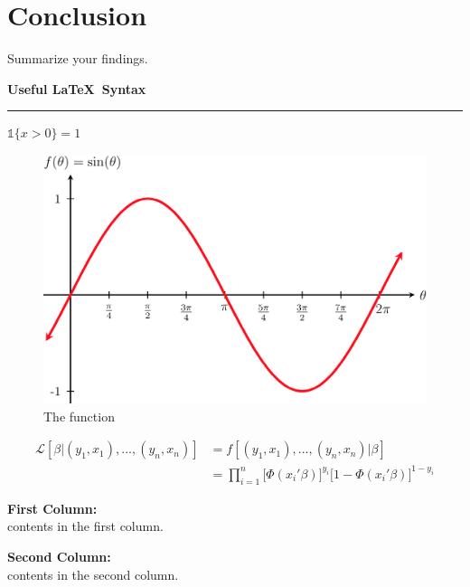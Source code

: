\documentclass[12pt, letterpaper, oneside]{article}
\begin{document}
\section{Conclusion}
Summarize your findings.




\begin{center}
    \textbf{\Large Useful \LaTeX \ Syntax}
    \noindent\rule{16cm}{0.4pt}
\end{center}

$\mathds{1}\{x>0\}=1$
\begin{figure}[h]
    \centering
    \caption{The function}
    \includegraphics[scale=0.2]{graph.png}
\end{figure}

\vspace*{-1cm}

\begin{align}
    \mathcal{L}[\beta|(y_1,x_1),...,(y_n,x_n)]&=f[(y_1,x_1),...,(y_n,x_n)|\beta]\\
    &=\prod\limits_{i=1}^n\Big[\Phi(x_i'\beta)\Big]^{y_i}\Big[1-\Phi(x_i'\beta)\Big]^{1-y_i}
\end{align}

\begin{multicols}{2}
    \raggedcolumns
    \noindent \textbf{First Column:}\\
    contents in the first column.
    
    \columnbreak
    \noindent \textbf{Second Column:}\\
    contents in the second column.
\end{multicols}
\end{document}
